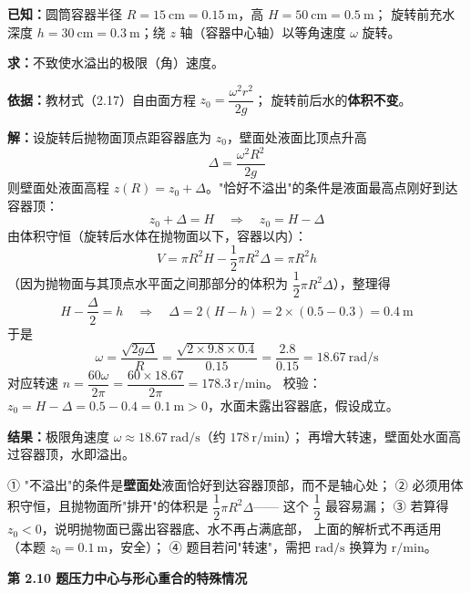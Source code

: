\begin{jie}
\textbf{已知：}圆筒容器半径 $R=15\ \mathrm{cm}=0.15\ \mathrm{m}$，高 $H=50\ \mathrm{cm}=0.5\ \mathrm{m}$；
旋转前充水深度 $h=30\ \mathrm{cm}=0.3\ \mathrm{m}$；绕 $z$ 轴（容器中心轴）以等角速度 $\omega$ 旋转。

\textbf{求：}不致使水溢出的极限（角）速度。

\textbf{依据：}教材式（2.17）自由面方程 $z_0=\dfrac{\omega^2r^2}{2g}$；
旋转前后水的\textbf{体积不变}。

\textbf{解：}设旋转后抛物面顶点距容器底为 $z_0$，壁面处液面比顶点升高
\[ \Delta=\frac{\omega^2R^2}{2g} \]
则壁面处液面高程 $z\left(R\right)=z_0+\Delta$。"恰好不溢出"的条件是液面最高点刚好到达容器顶：
\[ z_0+\Delta=H\quad\Rightarrow\quad z_0=H-\Delta \]
由体积守恒（旋转后水体在抛物面以下，容器以内）：
\[ V=\pi R^2H-\frac{1}{2}\pi R^2\Delta=\pi R^2h \]
（因为抛物面与其顶点水平面之间那部分的体积为 $\dfrac{1}{2}\pi R^2\Delta$），整理得
\[ H-\frac{\Delta}{2}=h\quad\Rightarrow\quad \Delta=2\left(H-h\right)=2\times(0.5-0.3)=0.4\ \mathrm{m} \]
于是
\[ \omega=\frac{\sqrt{2g\Delta}}{R}=\frac{\sqrt{2\times9.8\times0.4}}{0.15}=\frac{2.8}{0.15}=18.67\ \mathrm{rad/s} \]
对应转速 $n=\dfrac{60\omega}{2\pi}=\dfrac{60\times18.67}{2\pi}=178.3\ \mathrm{r/min}$。
校验：$z_0=H-\Delta=0.5-0.4=0.1\ \mathrm{m}>0$，水面未露出容器底，假设成立。

\textbf{结果：}极限角速度 $\omega\approx18.67\ \mathrm{rad/s}$（约 $178\ \mathrm{r/min}$）；
再增大转速，壁面处水面高过容器顶，水即溢出。
\end{jie}

\begin{yicuo}
① "不溢出"的条件是\textbf{壁面处}液面恰好到达容器顶部，而不是轴心处；
② 必须用体积守恒，且抛物面所"排开"的体积是 $\dfrac{1}{2}\pi R^2\Delta$——
这个 $\dfrac{1}{2}$ 最容易漏；
③ 若算得 $z_0<0$，说明抛物面已露出容器底、水不再占满底部，
上面的解析式不再适用（本题 $z_0=0.1\ \mathrm{m}$，安全）；
④ 题目若问"转速"，需把 $\mathrm{rad/s}$ 换算为 $\mathrm{r/min}$。
\end{yicuo}

\noindent\textbf{第 2.10 题\quad 压力中心与形心重合的特殊情况}

